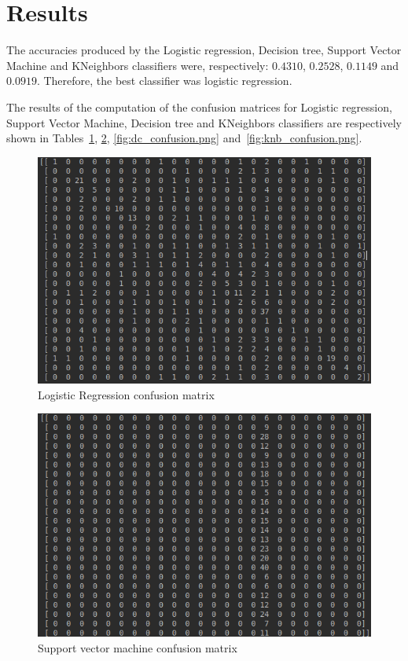 \documentclass{article} %
\begin{document}
\section{Results}

 The accuracies produced by the Logistic regression, Decision tree, Support Vector Machine and KNeighbors classifiers were, respectively: $0.4310$, $0.2528$, $0.1149$ and $0.0919$. Therefore, the best classifier was logistic regression.
 
 The results of the computation of the confusion matrices for  Logistic regression, Support Vector Machine, Decision tree and KNeighbors classifiers are respectively shown in Tables~\ref{fig:lr_confusion.png}, \ref{fig:SVM_confusion.png}, \ref{fig:dc_confusion.png} and~\ref{fig:knb_confusion.png}.
\hfill
\begin{figure}
	\includegraphics[width=\linewidth]{lr_confusion.png}
	\caption{Logistic Regression confusion matrix}
	\label{fig:lr_confusion.png}
\end{figure}

\begin{figure}
	\includegraphics[width=\linewidth]{SVM_confusion.png}
	\caption{Support vector machine confusion matrix}
	\label{fig:SVM_confusion.png}
\end{figure}
\end{document}
